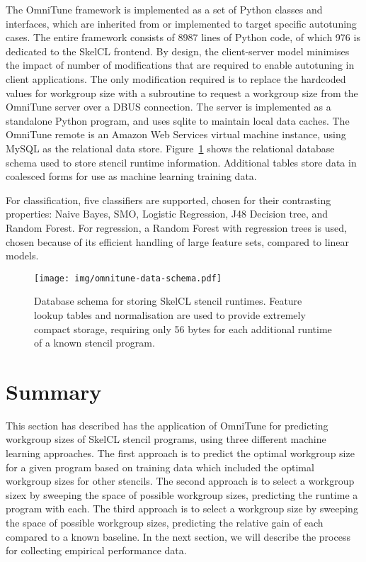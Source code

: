 The OmniTune framework is implemented as a set of Python classes and
interfaces, which are inherited from or implemented to target specific
autotuning cases. The entire framework consists of 8987 lines of
Python code, of which 976 is dedicated to the SkelCL frontend. By
design, the client-server model minimises the impact of number of
modifications that are required to enable autotuning in client
applications. The only modification required is to replace the
hardcoded values for workgroup size with a subroutine to request a
workgroup size from the OmniTune server over a DBUS connection. The
server is implemented as a standalone Python program, and uses sqlite
to maintain local data caches. The OmniTune remote is an Amazon Web
Services virtual machine instance, using MySQL as the relational data
store. Figure~\ref{fig:omnitune-system-flow} shows the relational
database schema used to store stencil runtime information. Additional
tables store data in coalesced forms for use as machine learning
training data.

For classification, five classifiers are supported, chosen for their
contrasting properties: Naive Bayes, SMO, Logistic Regression, J48
Decision tree, and Random Forest. For regression, a Random Forest with
regression trees is used, chosen because of its efficient handling of
large feature sets, compared to linear models.

\begin{figure}
  \centering
  \texttt{[image: img/omnitune-data-schema.pdf]}
  \caption[Database schema for storing performance results]{%
  Database schema for storing SkelCL stencil runtimes. Feature lookup
  tables and normalisation are used to provide extremely compact
  storage, requiring only 56 bytes for each additional runtime of a
  known stencil program.%
  }
  \label{fig:omnitune-system-flow}
\end{figure}


\section{Summary}

This section has described has the application of OmniTune for
predicting workgroup sizes of SkelCL stencil programs, using three
different machine learning approaches. The first approach is to
predict the optimal workgroup size for a given program based on
training data which included the optimal workgroup sizes for other
stencils. The second approach is to select a workgroup sizex by
sweeping the space of possible workgroup sizes, predicting the runtime
a program with each. The third approach is to select a workgroup size
by sweeping the space of possible workgroup sizes, predicting the
relative gain of each compared to a known baseline. In the next
section, we will describe the process for collecting empirical
performance data.
